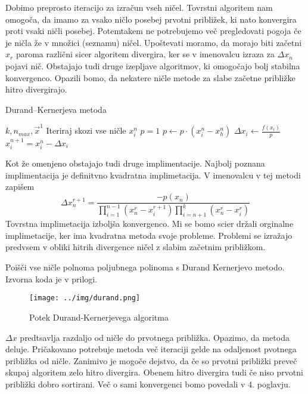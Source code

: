Dobimo preprosto iteracijo za izračun vseh ničel. Tovrstni algoritem nam omogoča, da imamo za vsako ničlo posebej prvotni približek, ki nato konvergira proti vsaki ničli posebej. Potemtakem ne potrebujemo več pregledovati pogoja če je ničla že v množici (seznamu) ničel. 
Upoštevati moramo, da morajo biti začetni $x_r$ paroma različni sicer algoritem divergira, ker se v imenovalcu izraza za $\Delta x_n$ pojavi nič. Obstajajo tudi druge izepljave algoritmov, ki omogočajo bolj stabilna konvergenco. Opazili bomo, da nekatere ničle metode za slabe začetne približke hitro divergirajo.



\begin{algorithm}[H]
    \caption{Durand–Kernerjeva metoda}
    \begin{algorithmic}
    \Require $k, n_{max},  \Vec{x}^1$ 
     \Comment Iteriraj skozi vse ničle
          
            \State \Return $x_i^n$
        \EndIf
        \State $p = 1$ 
                \State $p \gets p \cdot (x_i^n - x_h^n)$
            \EndIf
        \EndFor
        \State $\Delta x_i \gets \frac{f(x_i)}{p}$
        \State $x^{n+1}_i = x^n_i - \Delta x_i$
    \EndFor
    \EndWhile
    \end{algorithmic}
    \end{algorithm}
    Kot že omenjeno obstajajo tudi druge implimentacije. Najbolj poznana implimentacija je definitvno kvadratna implimetacija. V imenovalcu v tej metodi zapišem
    \begin{equation}
        \Delta x^{r+1}_n = \frac{-p(x_n)}{\displaystyle \prod_{i=1}^{n-1} (x^r_{n} - x^{r+1}_i)  \prod_{i=n+1}^{k} (x^r_n - x^r_i)} 
    \end{equation}
    Tovrstna implimetacija izboljša konvergenco. Mi se bomo scier držali orginalne implimetacije, ker ima kvadratna metoda svoje probleme. Problemi se izražajo predvsem v obliki hitrih divergence ničel z slabim začetnim približkom.
    \newpage
\begin{primer}
    Poišči vse ničle polnoma poljubnega polinoma s Durand Kernerjevo metodo. Izvorna koda je v prilogi.
    \begin{figure}[H]
    \centering
    \texttt{[image: ../img/durand.png]}
    \caption{Potek Durand-Kernerjevega algoritma}
    \label{fig:durand}
\end{figure}
$\Delta x$ predtsavlja razdaljo od ničle do prvotnega približka. Opazimo, da metoda deluje. Pričakovano potrebuje metoda več iteraciji gelde na odaljenost pvotnega približka od ničle. Zanimivo je mogoče dejstvo, da če so prvotni približki preveč skupaj algoritem zelo hitro divergira. Obenem hitro divergira tudi če niso prvotni približki dobro sortirani. Več o sami konvergenci bomo povedali v 4. poglavju.
\end{primer}
